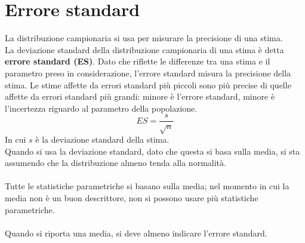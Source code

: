 \documentclass[10pt, draft]{book}
\begin{document}
\section{Errore standard \label{errst}}
La distribuzione campionaria si usa per misurare la precisione di una stima.
\\
La deviazione standard della distribuzione campionaria di una stima è detta \textbf{errore standard (ES)}. Dato che riflette le differenze tra una stima e il parametro preso in considerazione, l'errore standard misura la precisione della stima. Le stime affette da errori standard più piccoli sono più precise di quelle affette da errori standard più grandi: minore è l'errore standard, minore è l'incertezza riguardo al parametro della popolazione. 
\begin{equation}
    ES = \frac{s}{\sqrt{n}}
\end{equation}
In cui $s$ è la deviazione standard della stima.
\\
Quando si usa la deviazione standard, dato che questa si basa sulla media, si sta assumendo che la distribuzione almeno tenda alla normalità.
\\
\\
Tutte le statistiche parametriche si basano sulla media; nel momento in cui la media non è un buon descrittore, non si possono usare più statistiche parametriche.
\\
\\
Quando si riporta una media, si deve almeno indicare l’errore standard.
\end{document}
